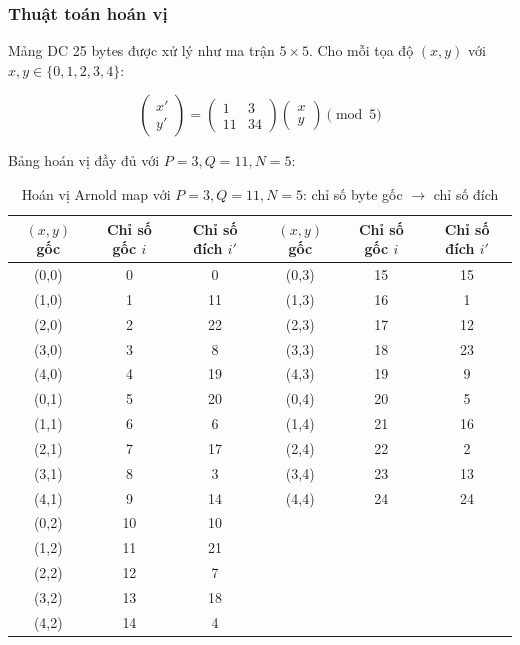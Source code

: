 \subsubsection{Thuật toán hoán vị}

Mảng DC 25 bytes được xử lý như ma trận $5 \times 5$. Cho mỗi tọa độ $(x, y)$
với $x, y \in \{0, 1, 2, 3, 4\}$:

\begin{equation}
\begin{pmatrix} x' \\ y' \end{pmatrix}
= \begin{pmatrix} 1 & 3 \\ 11 & 34 \end{pmatrix}
\begin{pmatrix} x \\ y \end{pmatrix} \pmod{5}
\end{equation}

Bảng hoán vị đầy đủ với $P=3, Q=11, N=5$:

\begin{table}[ht]
\centering
\caption{Hoán vị Arnold map với $P=3, Q=11, N=5$: chỉ số byte gốc $\to$ chỉ số đích}
\label{tab:arnold_perm}
\begin{tabular}{ccc|ccc}
\toprule
$(x,y)$ gốc & Chỉ số gốc $i$ & Chỉ số đích $i'$ &
$(x,y)$ gốc & Chỉ số gốc $i$ & Chỉ số đích $i'$ \\
\midrule
(0,0) & 0  & 0  & (0,3) & 15 & 15 \\
(1,0) & 1  & 11 & (1,3) & 16 & 1  \\
(2,0) & 2  & 22 & (2,3) & 17 & 12 \\
(3,0) & 3  & 8  & (3,3) & 18 & 23 \\
(4,0) & 4  & 19 & (4,3) & 19 & 9  \\
(0,1) & 5  & 20 & (0,4) & 20 & 5  \\
(1,1) & 6  & 6  & (1,4) & 21 & 16 \\
(2,1) & 7  & 17 & (2,4) & 22 & 2  \\
(3,1) & 8  & 3  & (3,4) & 23 & 13 \\
(4,1) & 9  & 14 & (4,4) & 24 & 24 \\
(0,2) & 10 & 10 & & & \\
(1,2) & 11 & 21 & & & \\
(2,2) & 12 & 7  & & & \\
(3,2) & 13 & 18 & & & \\
(4,2) & 14 & 4  & & & \\
\bottomrule
\end{tabular}
\end{table}

